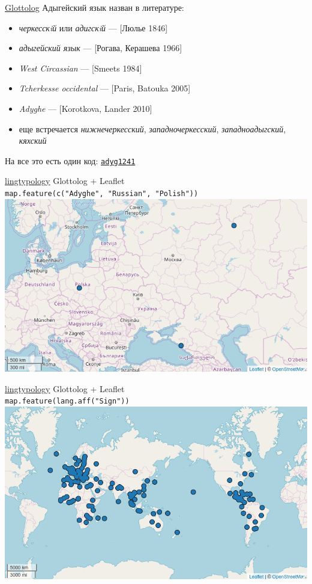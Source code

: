 \documentclass[13pt, t, aspectratio=169]{beamer}
\begin{document}
\begin{frame}{\href{https://glottolog.org/}{Glottolog}}
\alert{\large Адыгейский язык назван в литературе:}
\begin{itemize}
\item \textit{черкесскiй} или \textit{адигскiй} --- [Люлье 1846]
\item \textit{адыгейский язык} --- [Рогава, Керашева 1966]
\item \textit{West Circassian} --- [Smeets 1984]
\item \textit{Tcherkesse occidental} --- [Paris, Batouka 2005]
\item \textit{Adyghe} --- [Korotkova, Lander 2010]
\item еще встречается \textit{нижнечеркесский}, \textit{западночеркесский}, \textit{западноадыгский}, \textit{кяхский} \pause
\end{itemize}
\vfill
\alert{\large На все это есть один код: \href{https://glottolog.org/resource/languoid/id/adyg1241}{\texttt{adyg1241}}}
\end{frame}

\begin{frame}{\href{https://ropensci.github.io/lingtypology/}{lingtypology}}
\alert{\large Glottolog + Leaflet}\\
\vfill
\texttt{\small map.feature(c("Adyghe"{}, "Russian"{}, "Polish"))}\\
\includegraphics[width=0.8\linewidth]{images/01-map}
\end{frame}

\begin{frame}{\href{https://ropensci.github.io/lingtypology/}{lingtypology}}
\alert{\large Glottolog + Leaflet}\\
\vfill
\texttt{\small map.feature(lang.aff("Sign"))}\\
\includegraphics[width=0.8\linewidth]{images/02-sign}
\end{frame}
\end{document}
